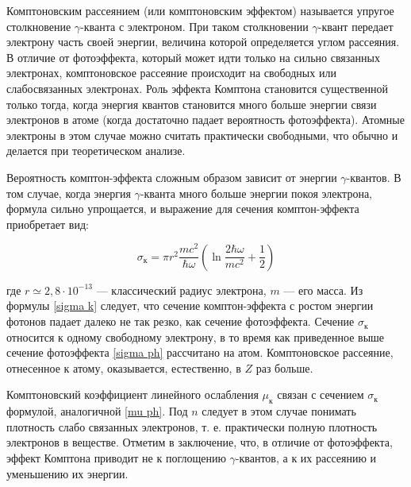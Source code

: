 Комптоновским рассеянием (или комптоновским эффектом) называется упругое
столкновение $\gamma$-кванта с электроном. При таком столкновении $\gamma$-квант
передает электрону часть своей энергии, величина которой определяется углом
рассеяния. В отличие от фотоэффекта, который может идти только на сильно
связанных электронах, комптоновское рассеяние происходит на свободных или
слабосвязанных электронах. Роль эффекта Комптона становится существенной только
тогда, когда энергия квантов становится много больше энергии связи электронов в
атоме (когда достаточно падает вероятность фотоэффекта). Атомные электроны в
этом случае можно считать практически свободными, что обычно и делается при
теоретическом анализе.

Вероятность комптон-эффекта сложным образом зависит от энергии $\gamma$-квантов.
В том случае, когда энергия $\gamma$-кванта много больше энергии покоя
электрона, формула сильно упрощается, и выражение для сечения комптон-эффекта
приобретает  вид:

\begin{equation}\label{sigma k}
\sigma_{\text{к}} = \pi r^2 \dfrac{mc^2}{\hbar\omega} \left( \ln{\dfrac{2\hbar\omega}{mc^2} + \dfrac{1}{2}} \right) 
\end{equation}

где $ r \simeq 2,8 \cdot 10^{-13} $ --- классический радиус электрона, $ m $ ---
его масса. Из формулы \eqref{sigma k} следует, что сечение комптон-эффекта с
ростом энергии фотонов падает далеко не так резко, как сечение фотоэффекта.
Сечение $\sigma_{\text{к}}$ относится к одному свободному электрону, в то время
как приведенное выше сечение фотоэффекта \eqref{sigma ph} рассчитано на атом.
Комптоновское рассеяние, отнесенное к атому, оказывается, естественно, в $Z$ раз
больше. 

Комптоновский коэффициент линейного ослабления $\mu_{\text{к}}$ связан с
сечением $\sigma_{\text{к}}$ формулой, аналогичной \eqref{mu ph}. Под $n$
следует в этом случае понимать плотность слабо связанных электронов, т. е.
практически полную плотность электронов в веществе. Отметим в заключение, что, в
отличие от фотоэффекта, эффект Комптона приводит не к поглощению
$\gamma$-квантов, а к их рассеянию и уменьшению их энергии.
